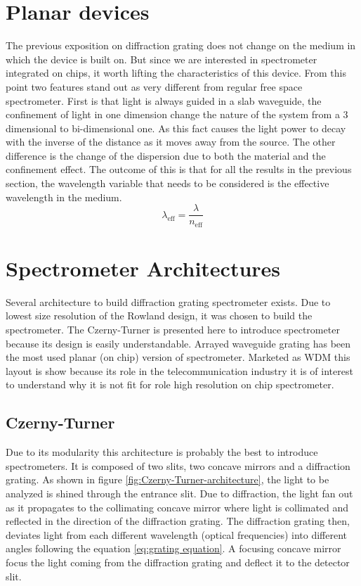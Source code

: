 \documentclass[12pt,twoside,english]{book}
\renewcommand{\~}{\perispomeni}%
\numberwithin{equation}{section}
\numberwithin{figure}{section}
\begin{document}
\section{Planar devices}

The previous exposition on diffraction grating does not change on the medium in which the device is built on. But since we are interested in spectrometer integrated on chips, it worth lifting the characteristics of this device. From this point two features stand out as very different from regular free space spectrometer. First is that light is always guided in a slab waveguide, the confinement of light in one dimension change the nature of the system from a 3 dimensional to bi-dimensional one. As this fact causes the light power to decay with the inverse of the distance as it moves away from the source. The other difference is the change of the dispersion due to both the material and the confinement effect. The outcome of this is that for all the results in the previous section, the wavelength variable that needs to be considered is the effective wavelength in the medium.
\begin{equation}
\lambda_{\text{eff}}=\frac{\lambda}{n_{\text{eff}}}\end{equation}
\section{Spectrometer Architectures}

Several architecture to build diffraction grating spectrometer exists. Due to lowest size resolution of the Rowland design, it was chosen to build the spectrometer. The Czerny-Turner is presented here to introduce spectrometer because its design is easily understandable. Arrayed waveguide grating has been the most used planar (on chip) version of spectrometer. Marketed as \gls{WDM} this layout is show because its role in the telecommunication industry it is of interest to understand why it is not fit for role high resolution on chip spectrometer. 

\subsection{Czerny-Turner}
\label{sub:Czerny-Turner}

Due to its modularity this architecture is probably the best to introduce spectrometers. It is composed of two slits, two concave mirrors and a diffraction grating. As shown in figure \ref{fig:Czerny-Turner-architecture}, the light to be analyzed is shined through the entrance slit. Due to diffraction, the light fan out as it propagates to the collimating concave mirror where light is collimated and reflected in the direction of the diffraction grating. The diffraction grating then, deviates light from each different wavelength (optical frequencies) into different angles following the equation \ref{eq:grating equation}. A focusing concave mirror focus the light coming from the diffraction grating and deflect it to the detector slit.
\end{document}
